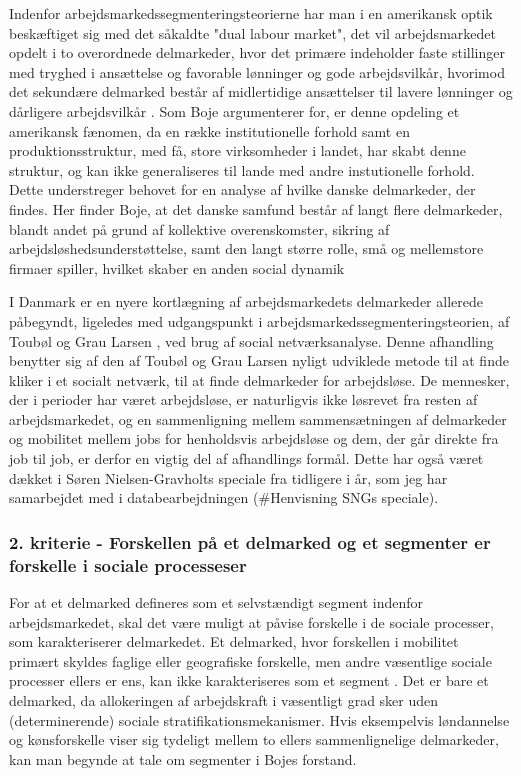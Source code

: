 Indenfor arbejdsmarkedssegmenteringsteorierne har man i en amerikansk optik beskæftiget sig med det såkaldte "dual labour market", det vil arbejdsmarkedet opdelt i to overordnede delmarkeder, hvor det primære indeholder faste stillinger med tryghed i ansættelse og favorable lønninger og gode arbejdsvilkår, hvorimod det sekundære delmarked består af midlertidige ansættelser til lavere lønninger og dårligere arbejdsvilkår \parencite{Piore1980}. Som Boje argumenterer for, er denne opdeling et amerikansk fænomen, da en række institutionelle forhold samt en produktionsstruktur, med få, store virksomheder i landet, har skabt denne struktur, og kan ikke generaliseres til lande med andre instutionelle forhold. Dette understreger behovet for en analyse af hvilke danske delmarkeder, der findes. Her finder Boje, at det danske samfund består af langt flere delmarkeder, blandt andet på grund af kollektive overenskomster, sikring af arbejdsløshedsunderstøttelse, samt den langt større rolle, små og mellemstore firmaer spiller, hvilket skaber en anden social dynamik \parencite[36]{Boje1985}

I Danmark er en nyere kortlægning af arbejdsmarkedets delmarkeder allerede påbegyndt, ligeledes med udgangspunkt i arbejdsmarkedssegmenteringsteorien, af Toubøl og Grau Larsen \parencite{Touboel2013}, ved brug af social netværksanalyse. Denne afhandling benytter sig af den af Toubøl og Grau Larsen nyligt udviklede metode til at finde kliker i et socialt netværk, til at finde delmarkeder for arbejdsløse. De mennesker, der i perioder har været arbejdsløse, er naturligvis ikke løsrevet fra resten af arbejdsmarkedet, og en sammenligning mellem sammensætningen af delmarkeder og mobilitet mellem jobs for henholdsvis arbejdsløse og dem, der går direkte fra job til job, er derfor en vigtig del af afhandlings formål. Dette har også været dækket i Søren Nielsen-Gravholts speciale fra tidligere i år, som jeg har samarbejdet med i databearbejdningen (\#Henvisning SNGs speciale).  


\subsubsection{2. kriterie - Forskellen på et delmarked og et segmenter er forskelle i sociale processeser}

For at et delmarked defineres som et selvstændigt segment indenfor arbejdsmarkedet, skal det være muligt at påvise forskelle i de sociale processer, som karakteriserer delmarkedet. Et delmarked, hvor forskellen i mobilitet primært skyldes faglige eller geografiske forskelle, men andre væsentlige sociale processer ellers er ens, kan ikke karakteriseres som et segment \parencite[41]{Boje1985}. Det er bare et delmarked, da allokeringen af arbejdskraft i væsentligt grad sker uden (determinerende) sociale stratifikationsmekanismer. Hvis eksempelvis løndannelse og kønsforskelle viser sig tydeligt mellem to ellers sammenlignelige delmarkeder, kan man begynde at tale om segmenter i Bojes forstand. 

